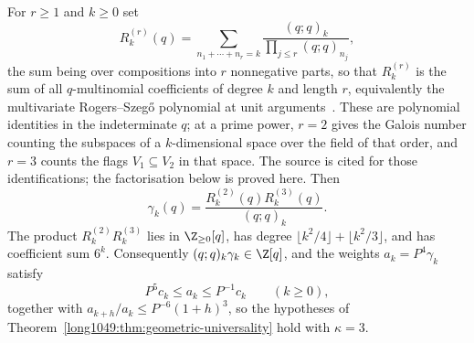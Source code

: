 \begin{proposition}
\label{long1049:prop:rogers-factorisation}
For $r\ge1$ and $k\ge0$ set
\[
 R_k^{(r)}(q)=\sum_{n_1+\cdots+n_r=k}
 \frac{(q;q)_k}{\prod_{j\le r}(q;q)_{n_j}},
\]
the sum being over compositions into $r$ nonnegative parts, so that
$R_k^{(r)}$ is the sum of all $q$-multinomial coefficients of degree $k$ and
length $r$, equivalently the multivariate Rogers--Szeg\H{o} polynomial at unit
arguments~\cite{vinroot2010}. These are polynomial identities in the
indeterminate $q$; at a prime power, $r=2$ gives the Galois number counting
the subspaces of a $k$-dimensional space over the field of that order, and
$r=3$ counts the flags $V_1\subseteq V_2$ in that space. The source is cited
for those identifications; the factorisation below is proved here. Then
\[
 \gamma_k(q)=\frac{R_k^{(2)}(q)R_k^{(3)}(q)}{(q;q)_k}.
\]
The product $R_k^{(2)}R_k^{(3)}$ lies in $\Z_{\ge0}[q]$, has degree
$\lfloor k^2/4\rfloor+\lfloor k^2/3\rfloor$, and has coefficient sum $6^k$.
Consequently $(q;q)_k\gamma_k\in\Z[q]$, and the weights
$a_k=P^4\gamma_k$ satisfy
\[
 P^5c_k\le a_k\le P^{-1}c_k
 \qquad(k\ge0),
\]
together with $a_{k+h}/a_k\le P^{-6}(1+h)^3$, so the hypotheses of
Theorem~\ref{long1049:thm:geometric-universality} hold with $\kappa=3$.
\end{proposition}

